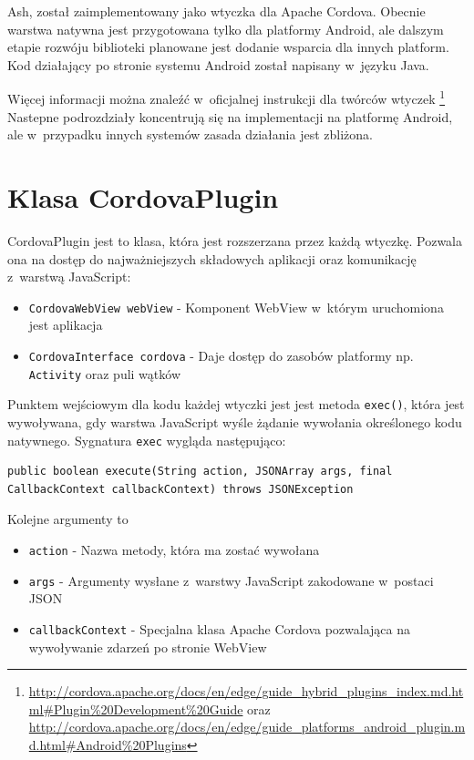 \documentclass[brudnopis]{xmgr}
\begin{document}
Ash, został zaimplementowany jako wtyczka dla Apache Cordova. Obecnie warstwa natywna jest przygotowana tylko dla platformy Android, ale dalszym etapie rozwóju biblioteki planowane jest dodanie wsparcia dla innych platform. Kod działający po stronie systemu Android został napisany w~języku Java.

Więcej informacji można znaleźć w~oficjalnej instrukcji dla twórców wtyczek
\footnote{
  \url{http://cordova.apache.org/docs/en/edge/guide\_hybrid\_plugins\_index.md.html\#Plugin\%20Development\%20Guide}  
  oraz 
  \url{http://cordova.apache.org/docs/en/edge/guide\_platforms\_android\_plugin.md.html\#Android\%20Plugins}   
}
Nastepne podrozdziały koncentrują się na implementacji na platformę Android, ale w~przypadku innych systemów zasada działania jest zbliżona.

\section{Klasa CordovaPlugin}

CordovaPlugin jest to klasa, która jest rozszerzana przez każdą wtyczkę. Pozwala ona na dostęp do najważniejszych składowych aplikacji oraz komunikację z~warstwą JavaScript: 

\begin{itemize}
  \item \texttt{CordovaWebView webView} - Komponent WebView w~którym uruchomiona jest aplikacja
  \item \texttt{CordovaInterface cordova} - Daje dostęp do zasobów platformy np. \texttt{Activity} oraz puli wątków
\end{itemize}

Punktem wejściowym dla kodu każdej wtyczki jest jest metoda \texttt{exec()}, która jest wywoływana, gdy warstwa JavaScript wyśle żądanie wywołania określonego kodu natywnego. Sygnatura \texttt{exec} wygląda następująco:

\begin{lstlisting}
public boolean execute(String action, JSONArray args, final CallbackContext callbackContext) throws JSONException
\end{lstlisting}

Kolejne argumenty to
\begin{itemize}
  \item \texttt{action} - Nazwa metody, która ma zostać wywołana
  \item \texttt{args} - Argumenty wysłane z~warstwy JavaScript zakodowane w~postaci JSON
  \item \texttt{callbackContext} - Specjalna klasa Apache Cordova pozwalająca na wywoływanie zdarzeń po stronie WebView 
\end{itemize}
\end{document}
